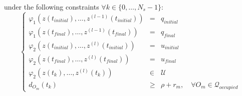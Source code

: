 under the following constraints $\forall k \in \{0,\dotsc,N_s -1\}$:
\begin{equation}%
\left\lbrace\begin{array}{lcl}
	\varphi_1(z(t_{initial}),\dotsc,z^{(l-1)}(t_{initial})) & = & q_{initial}\\
    \varphi_1(z(t_{final}),\dotsc,z^{(l-1)}(t_{final})) & = & q_{final}\\
    \varphi_2(z(t_{initial}),\dotsc,z^{(l)}(t_{initial})) & = & u_{initial}\\
    \varphi_2(z(t_{final}),\dotsc,z^{(l)}(t_{final}))& = & u_{final}\\
    \varphi_2(z(t_k),\dotsc,z^{(l)}(t_k)) &\in& \mathcal{U}\\
    d_{O_m}(t_k) &\geq& \rho + r_m,\quad \forall O_m \in \mathcal{Q}_{occupied}
\end{array}\right.
\end{equation}

% 
% 
% 






